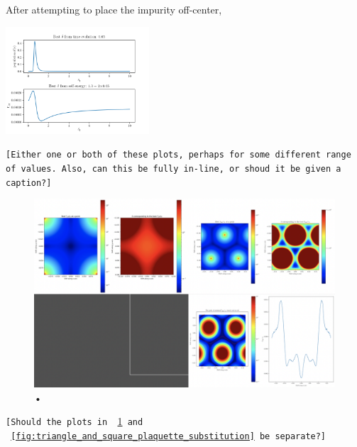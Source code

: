 \documentclass[aps,pra,superscriptaddress,twocolumn]{revtex4-1}
\newcommand{\fref}[1]{\text{Fig.}~\ref{#1}}
\newcommand{\commentSB}[1]{\texttt{\color{blue}[#1]}}
\newcommand{\commentTP}[1]{\texttt{\color{green}[#1]}}
\begin{document}


After attempting to place the impurity off-center, 



\includegraphics[width=0.4\textwidth]{figures/delta_check.png} 

\commentSB{Either one or both of these plots, perhaps for some different range of values. Also, can this be fully in-line, or shoud it be given a caption?}

\begin{figure}
    \centering
    \includegraphics[width=1.0\textwidth]{figures/triangle_and_square_plaquette_interstitial.png} 
    \caption{•}
    \label{fig:triangle_and_square_plaquette_interstitial}
\end{figure}
\commentSB{Should the plots in \fref{fig:triangle_and_square_plaquette_interstitial} and \fref{fig:triangle_and_square_plaquette_substitution} be separate?}
\end{document}
